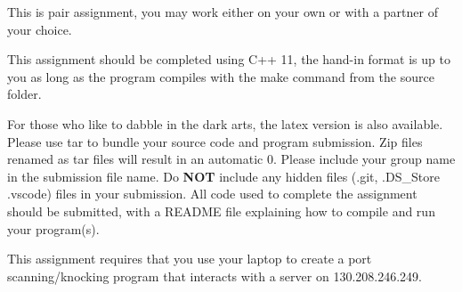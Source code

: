 \documentclass[9pt, addpoints]{exam}
\begin{document}
\large     
\vspace{2cm}
\begin{center}
    \begin{minipage}{40em}
        \begin{center}
          This is pair assignment, you may work either on your own
          or with a partner of your choice. 
        \end{center}
         
        \vspace{6pt}
        
          This assignment should be completed using C++ 11, the hand-in format is up to you as long as the program compiles with the make command from the source folder.
          
        \vspace{6pt}
        
    For those who like to dabble in the dark arts, the latex version 
    is also available.  Please use tar to bundle your source code and program submission. Zip files renamed as tar files will result in an automatic 0. Please include your group name in the submission file name. Do \textbf{NOT} include any hidden files (.git, .DS\_Store .vscode) files in your submission.
All code used to complete the assignment should be submitted, with a README file explaining how to compile and run your program(s).
    
        \vspace{6pt}
    This assignment requires that you use your laptop to create
    a port scanning/knocking program that interacts with a server
    on 130.208.246.249. 


    \par
    \vspace{12pt}
    \end{minipage}
\end{center}

\vspace{4cm}
\begin{center}
    \gradetable[h]
\end{center}
\newpage
%
%
\end{document}
